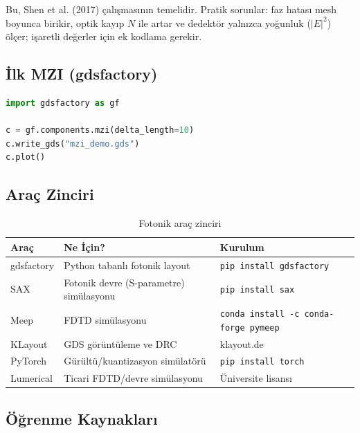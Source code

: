 \documentclass[11pt,a4paper]{article}
\begin{document}
Bu, Shen et al. (2017) çalışmasının temelidir. Pratik sorunlar: faz hatası mesh boyunca birikir, optik kayıp $N$ ile artar ve dedektör yalnızca yoğunluk ($|E|^2$) ölçer; işaretli değerler için ek kodlama gerekir.

\subsection{İlk MZI (gdsfactory)}

\begin{lstlisting}[language=Python]
import gdsfactory as gf

c = gf.components.mzi(delta_length=10)
c.write_gds("mzi_demo.gds")
c.plot()
\end{lstlisting}

\subsection{Araç Zinciri}

\begin{table}[h!]
\centering
\small
\begin{tabular}{@{}p{3.2cm}p{6.3cm}p{4.5cm}@{}}
\toprule
\textbf{Araç} & \textbf{Ne İçin?} & \textbf{Kurulum} \\
\midrule
gdsfactory & Python tabanlı fotonik layout & \texttt{pip install gdsfactory} \\
SAX & Fotonik devre (S-parametre) simülasyonu & \texttt{pip install sax} \\
Meep & FDTD simülasyonu & \texttt{conda install -c conda-forge pymeep} \\
KLayout & GDS görüntüleme ve DRC & klayout.de \\
PyTorch & Gürültü/kuantizasyon simülatörü & \texttt{pip install torch} \\
Lumerical & Ticari FDTD/devre simülasyonu & Üniversite lisansı \\
\bottomrule
\end{tabular}
\caption{Fotonik araç zinciri}
\end{table}

\subsection{Öğrenme Kaynakları}
\end{document}
